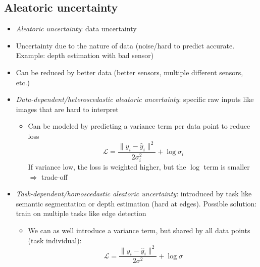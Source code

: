 \subsection{Aleatoric uncertainty}
\begin{itemize}
	\item \textit{Aleatoric uncertainty}: data uncertainty
	\item Uncertainty due to the nature of data (noise/hard to predict accurate. Example: depth estimation with bad sensor)
	\item Can be reduced by better data (better sensors, multiple different sensors, etc.)
	\item \textit{Data-dependent/heteroscedastic aleatoric uncertainty}: specific raw inputs like images that are hard to interpret
	\begin{itemize}
		\item Can be modeled by predicting a variance term per data point to reduce loss
		$$\mathcal{L} = \frac{\lVert y_i - \hat{y}_i\rVert^2}{2\sigma_i^2} + \log \sigma_i$$
		If variance low, the loss is weighted higher, but the $\log$ term is smaller $\Rightarrow$ trade-off
	\end{itemize}
	\item \textit{Task-dependent/homoscedastic aleatoric uncertainty}: introduced by task like semantic segmentation or depth estimation (hard at edges). Possible solution: train on multiple tasks like edge detection
	\begin{itemize}
		\item We can as well introduce a variance term, but shared by all data points (task individual):
		$$\mathcal{L} = \frac{\lVert y_i - \hat{y}_i\rVert^2}{2\sigma^2} + \log \sigma$$
	\end{itemize}
\end{itemize}

